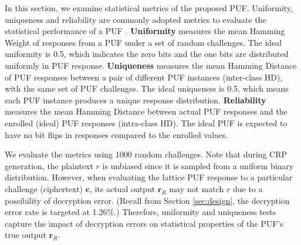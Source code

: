 

In this section, we examine statistical metrics of the proposed PUF. 
Uniformity, uniqueness and reliability are commonly adopted metrics to evaluate the statistical performance of a PUF \cite{maiti2013systematic}. 
\textbf{Uniformity} measures the mean Hamming Weight of responses from a PUF under a set of random challenges. 
The ideal uniformity is 0.5, which indicates the zero bits and the one bits are distributed uniformly in PUF response. 
\textbf{Uniqueness} measures the mean Hamming Distance of PUF responses between a pair of different PUF instances (inter-class HD), with the same set of PUF challenges. 
The ideal uniqueness is 0.5, which means each PUF instance produces a unique response distribution. \textbf{Reliability} measures the mean Hamming Distance between actual PUF responses and the enrolled (ideal) PUF responses (intra-class HD). 
The ideal PUF is expected to have no bit flips in responses compared to the enrolled values.

We evaluate the metrics %
using 1000 random challenges.
Note that during CRP generation, the plaintext $r$ is unbiased since it is sampled from a uniform binary distribution. However, when evaluating the lattice PUF response to a particular challenge (ciphertext) $\mathbf{c}$, its actual output $\mathbf{r}_R$ may not match $r$ due to a possibility of decryption error. (Recall from Section \ref{sec:design}, the decryption error rate is targeted at 1.26\%.) 
Therefore, uniformity and uniqueness tests capture the impact of decryption errors on statistical properties of the PUF's true output $\mathbf{r}_R$.

